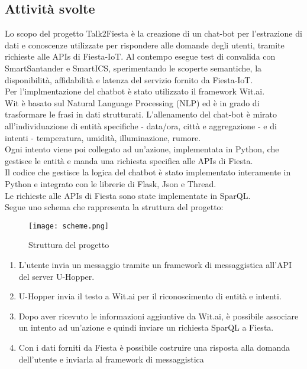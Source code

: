 \documentclass[a4paper,11pt]{article}
\theoremstyle{plain}
\begin{document}
\subsection*{Attività svolte}
Lo scopo del progetto Talk2Fiesta è la creazione di un chat-bot per l’estrazione di dati e conoscenze utilizzate per rispondere alle domande degli utenti, tramite richieste alle APIs di Fiesta-IoT. Al contempo esegue test di convalida con SmartSantander e SmartICS, sperimentando le scoperte semantiche, la disponibilità, affidabilità e latenza del servizio fornito da Fiesta-IoT. \\
Per l'implmentazione del chatbot è stato utilizzato il framework Wit.ai.\\
Wit è basato sul Natural Language Processing (NLP) ed è in grado di trasformare le frasi in dati strutturati.
L'allenamento del chat-bot è mirato all'individuazione di entità specifiche - data/ora, città e aggregazione - e di intenti - temperatura, umidità, illuminazione, rumore. \\
Ogni intento viene poi collegato ad un'azione, implementata in Python, che gestisce le entità e manda una richiesta specifica alle APIs di Fiesta. \\
Il codice che gestisce la logica del chatbot è stato implementato interamente in Python e integrato con le librerie di Flask, Json e Thread.\\
Le richieste alle APIs di Fiesta sono state implementate in SparQL.\\
Segue uno schema che rappresenta la struttura del progetto:
\vspace{0.2cm}
\begin{figure}[!h]
\centering
\texttt{[image: scheme.png]}
\caption{Struttura del progetto}
\end{figure}
\vspace{1cm}
\begin{enumerate}
\item L'utente invia un messaggio tramite un framework di messaggistica all'API del server U-Hopper. 
\item U-Hopper invia il testo a Wit.ai per il riconoscimento di entità e intenti.
\item Dopo aver ricevuto le informazioni aggiuntive da Wit.ai, è possibile associare un intento ad un'azione e quindi inviare un richiesta SparQL a Fiesta.
\item Con i dati forniti da Fiesta è possibile costruire una risposta alla domanda dell'utente e inviarla al framework di messaggistica
\end{enumerate}
\end{document}
